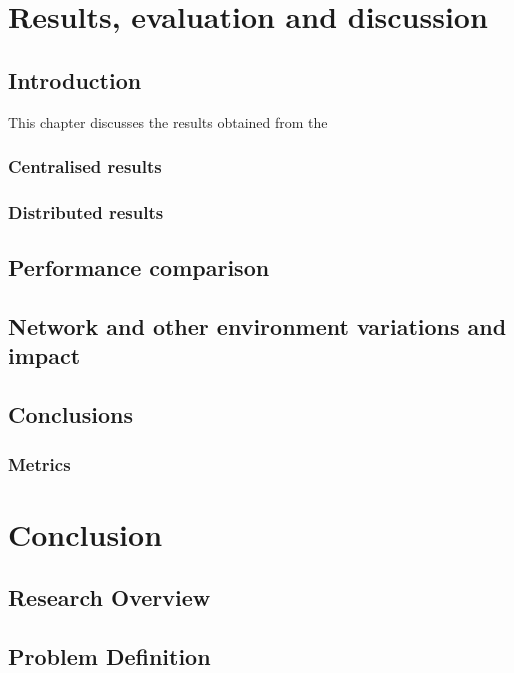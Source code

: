 \documentclass[oneside,12pt]{book}
\begin{document}
\chapter{Results, evaluation and discussion}
\section{Introduction}
This chapter discusses the results obtained from the 

\subsection{Centralised results}

\subsection{Distributed results}

\section{Performance comparison}

\section{Network and other environment variations and impact}

\section{Conclusions}

\subsection{Metrics}



\chapter{Conclusion}
\section{Research Overview}
\section{Problem Definition}
\end{document}
